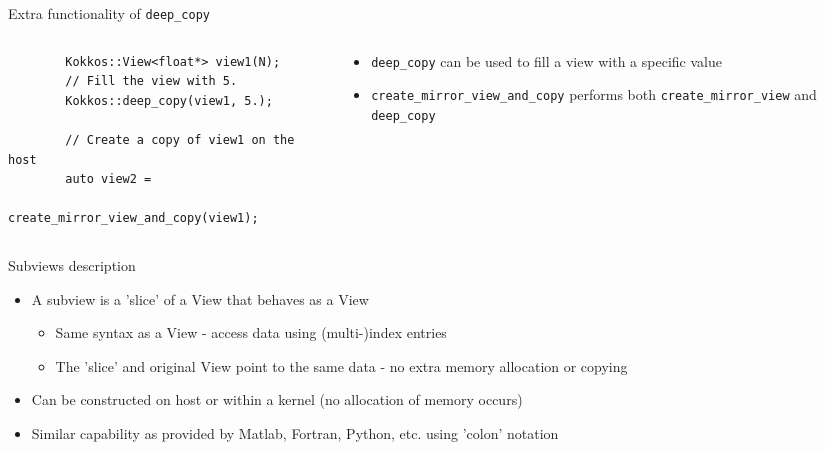 \documentclass[
    aspectratio=169,
    \createHandout
]{beamer}
\begin{document}

\begin{frame}[fragile]{Extra functionality of \texttt{deep\_copy}}
  \begin{columns}
    \begin{column}{0.55\linewidth}
      \begin{verbatim}
        Kokkos::View<float*> view1(N);
        // Fill the view with 5.
        Kokkos::deep_copy(view1, 5.);

        // Create a copy of view1 on the host 
        auto view2 =
          create_mirror_view_and_copy(view1);
      \end{verbatim}
    \end{column}
    \begin{column}{0.45\linewidth}
      \begin{itemize}
        \item \texttt{deep\_copy} can be used to fill a view with a specific value
        \item \texttt{create\_mirror\_view\_and\_copy} performs both \texttt{create\_mirror\_view} and \texttt{deep\_copy}
      \end{itemize}
    \end{column}
  \end{columns}
\end{frame}


\begin{frame}{Subviews description}
    \begin{itemize}
        \item A subview is a ’slice’ of a View that behaves as a View
        \pause
        \begin{itemize}
            \item Same syntax as a View - access data using (multi-)index entries
            \pause
            \item The ’slice’ and original View point to the same data - no extra
            memory allocation or copying
        \end{itemize}
        \pause
        \item Can be constructed on host or within a kernel (no allocation
        of memory occurs)
        \pause
        \item Similar capability as provided by Matlab, Fortran, Python, etc.
        using ’colon’ notation
    \end{itemize}
\end{frame}
\end{document}
